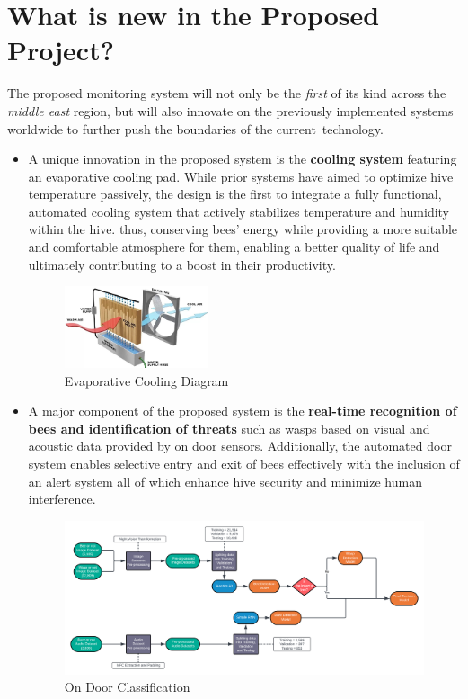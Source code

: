 \documentclass[12pt]{article}
\begin{document}
	\section{What is new in the Proposed Project?}
The proposed monitoring system will not only be the \textit{first} of its kind across the \textit{middle east} region, but will also innovate on the previously implemented systems worldwide to further push the boundaries of the current technology. \\
	\begin{itemize}
		\item A unique innovation in the proposed system is the \textbf{cooling system} featuring an evaporative cooling pad. While prior systems have aimed to optimize hive temperature passively, the design is the first to integrate a fully functional, automated cooling system that actively stabilizes temperature and humidity within the hive. thus, conserving bees' energy while providing a more suitable and comfortable atmosphere  for them, enabling a better quality of life and ultimately contributing to a boost in their productivity. \\
		\begin{figure}[H]
			\centering
			\includegraphics[width=0.4\textwidth]{Images/swamp-cooler-diagram.jpg}
			\caption{Evaporative Cooling Diagram \cite{powerbreezer2021}}
			\label{fig:EVAPORATIVE_COOLER}
		\end{figure}
		
		\item A major component of the proposed system is the \textbf{real-time recognition of bees and identification of threats} such as wasps based on visual and acoustic data provided by on door sensors. Additionally, the automated door system enables selective entry and exit of bees effectively with the inclusion of an alert system all of which enhance hive security and minimize human interference.
		\begin{figure}[H]
			\vspace{2 cm}
			\centering
			\includegraphics[width=\textwidth]{Images/Pipelines/On Door Classifier Pipeline Diagram.png}
			\caption{On Door Classification}
			\label{fig:DOOR_CLASSIFICATION}
						\vspace{2 cm}
		\end{figure}
	\end{itemize}
\end{document}
